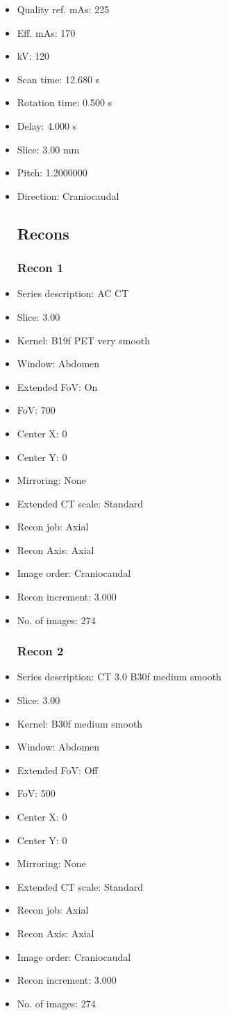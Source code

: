 \documentclass[12pt]{article}
\begin{document}
\begin{itemize}
\subsection{Scan}
\item Quality ref. mAs: 225\item Eff. mAs: 170\item kV: 120\item Scan time: 12.680 s\item Rotation time: 0.500 s\item Delay: 4.000 s\item Slice: 3.00 mm\item Pitch: 1.2000000\item Direction: Craniocaudal\subsection{Recons}

\subsubsection{Recon 1}
\item Series description: AC CT
\item Slice: 3.00
\item Kernel: B19f PET very smooth
\item Window: Abdomen
\item Extended FoV: On
\item FoV: 700
\item Center X: 0
\item Center Y: 0
\item Mirroring: None
\item Extended CT scale: Standard
\item Recon job: Axial
\item Recon Axis: Axial
\item Image order: Craniocaudal
\item Recon increment: 3.000
\item No. of images: 274
\subsubsection{Recon 2}
\item Series description: CT 3.0 B30f medium smooth
\item Slice: 3.00
\item Kernel: B30f medium smooth
\item Window: Abdomen
\item Extended FoV: Off
\item FoV: 500
\item Center X: 0
\item Center Y: 0
\item Mirroring: None
\item Extended CT scale: Standard
\item Recon job: Axial
\item Recon Axis: Axial
\item Image order: Craniocaudal
\item Recon increment: 3.000
\item No. of images: 274

\end{itemize}
\end{document}
